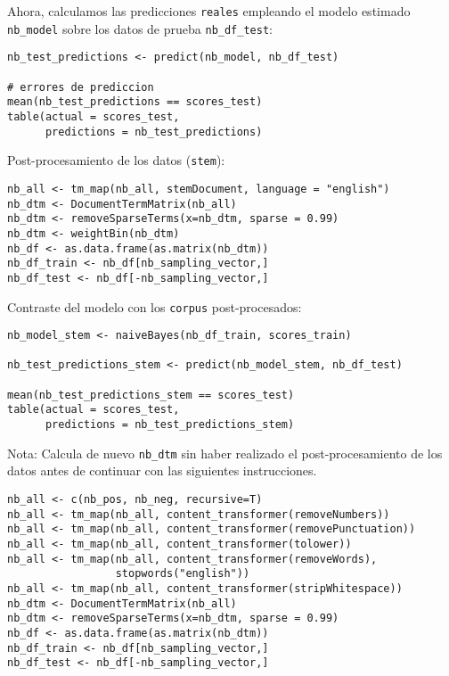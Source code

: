 \documentclass[11pt,]{article}
\begin{document}
Ahora, calculamos las predicciones \texttt{reales} empleando el modelo
estimado \texttt{nb\_model} sobre los datos de prueba
\texttt{nb\_df\_test}:

\begin{verbatim}
nb_test_predictions <- predict(nb_model, nb_df_test)

# errores de prediccion
mean(nb_test_predictions == scores_test)
table(actual = scores_test, 
      predictions = nb_test_predictions)
\end{verbatim}

Post-procesamiento de los datos (\texttt{stem}):

\begin{verbatim}
nb_all <- tm_map(nb_all, stemDocument, language = "english")
nb_dtm <- DocumentTermMatrix(nb_all) 
nb_dtm <- removeSparseTerms(x=nb_dtm, sparse = 0.99)
nb_dtm <- weightBin(nb_dtm)
nb_df <- as.data.frame(as.matrix(nb_dtm))
nb_df_train <- nb_df[nb_sampling_vector,]
nb_df_test <- nb_df[-nb_sampling_vector,]
\end{verbatim}

Contraste del modelo con los \texttt{corpus} post-procesados:

\begin{verbatim}
nb_model_stem <- naiveBayes(nb_df_train, scores_train)

nb_test_predictions_stem <- predict(nb_model_stem, nb_df_test)

mean(nb_test_predictions_stem == scores_test)
table(actual = scores_test, 
      predictions = nb_test_predictions_stem)
\end{verbatim}

Nota: Calcula de nuevo \texttt{nb\_dtm} sin haber realizado el
post-procesamiento de los datos antes de continuar con las siguientes
instrucciones.

\begin{verbatim}
nb_all <- c(nb_pos, nb_neg, recursive=T)
nb_all <- tm_map(nb_all, content_transformer(removeNumbers))
nb_all <- tm_map(nb_all, content_transformer(removePunctuation))
nb_all <- tm_map(nb_all, content_transformer(tolower))
nb_all <- tm_map(nb_all, content_transformer(removeWords),
                 stopwords("english"))
nb_all <- tm_map(nb_all, content_transformer(stripWhitespace))
nb_dtm <- DocumentTermMatrix(nb_all) 
nb_dtm <- removeSparseTerms(x=nb_dtm, sparse = 0.99)
nb_df <- as.data.frame(as.matrix(nb_dtm))
nb_df_train <- nb_df[nb_sampling_vector,]
nb_df_test <- nb_df[-nb_sampling_vector,]
\end{verbatim}
\end{document}
